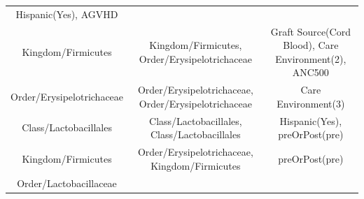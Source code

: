 \documentclass[12pt,twoside]{dukestatscithesis}
\begin{document}
\begin{longtable}[]{@{}ccc@{}}
\begin{minipage}[t]{0.22\columnwidth}
Hispanic(Yes), AGVHD\strut
\end{minipage}\tabularnewline
\begin{minipage}[t]{0.23\columnwidth}\centering\strut
Kingdom/Firmicutes\strut
\end{minipage} & \begin{minipage}[t]{0.46\columnwidth}\centering\strut
Kingdom/Firmicutes, Order/Erysipelotrichaceae\strut
\end{minipage} & \begin{minipage}[t]{0.22\columnwidth}\centering\strut
Graft Source(Cord Blood), Care Environment(2), ANC500\strut
\end{minipage}\tabularnewline
\begin{minipage}[t]{0.23\columnwidth}\centering\strut
Order/Erysipelotrichaceae\strut
\end{minipage} & \begin{minipage}[t]{0.46\columnwidth}\centering\strut
Order/Erysipelotrichaceae, Order/Erysipelotrichaceae\strut
\end{minipage} & \begin{minipage}[t]{0.22\columnwidth}\centering\strut
Care Environment(3)\strut
\end{minipage}\tabularnewline
\begin{minipage}[t]{0.23\columnwidth}\centering\strut
Class/Lactobacillales\strut
\end{minipage} & \begin{minipage}[t]{0.46\columnwidth}\centering\strut
Class/Lactobacillales, Class/Lactobacillales\strut
\end{minipage} & \begin{minipage}[t]{0.22\columnwidth}\centering\strut
Hispanic(Yes), preOrPost(pre)\strut
\end{minipage}\tabularnewline
\begin{minipage}[t]{0.23\columnwidth}\centering\strut
Kingdom/Firmicutes\strut
\end{minipage} & \begin{minipage}[t]{0.46\columnwidth}\centering\strut
Order/Erysipelotrichaceae, Kingdom/Firmicutes\strut
\end{minipage} & \begin{minipage}[t]{0.22\columnwidth}\centering\strut
preOrPost(pre)\strut
\end{minipage}\tabularnewline
\begin{minipage}[t]{0.23\columnwidth}\centering\strut
Order/Lactobacillaceae\strut
\end{minipage} & \begin{minipage}[t]{0.46\columnwidth}\centering\strut

\end{minipage}
\end{longtable}
\end{document}
